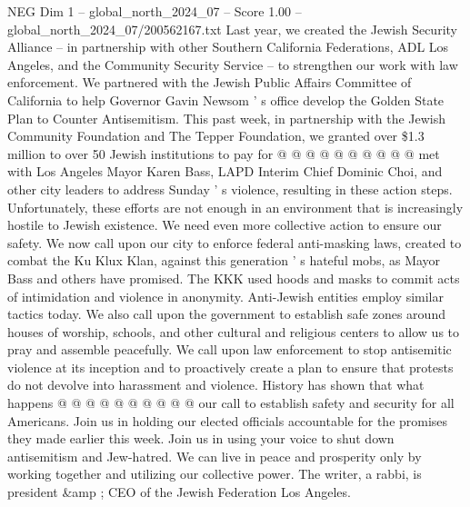 \begin{textsample}{NEG Dim 1 – global\_north\_2024\_07 – Score 1.00 – global\_north\_2024\_07/200562167.txt}
Last year, we created the Jewish Security Alliance -- in partnership with other Southern California Federations, ADL Los Angeles, and the Community Security Service -- to strengthen our work with law enforcement.
We partnered with the Jewish Public Affairs Committee of California to help Governor Gavin Newsom ' s office develop the Golden State Plan to Counter Antisemitism.
This past week, in partnership with the Jewish Community Foundation and The Tepper Foundation, we granted over \$1.3 million to over 50 Jewish institutions to pay for @ @ @ @ @ @ @ @ @ @ met with Los Angeles Mayor Karen Bass, LAPD Interim Chief Dominic Choi, and other city leaders to address Sunday ' s violence, resulting in these action steps.
Unfortunately, these efforts are not enough in an environment that is increasingly hostile to Jewish existence.
We need even more collective action to ensure our safety.
We now call upon our city to enforce federal anti-masking laws, created to combat the Ku Klux Klan, against this generation ' s hateful mobs, as Mayor Bass and others have promised.
The KKK used hoods and masks to commit acts of intimidation and violence in anonymity.
Anti-Jewish entities employ similar tactics today.
We also call upon the government to establish safe zones around houses of worship, schools, and other cultural and religious centers to allow us to pray and assemble peacefully.
We call upon law enforcement to stop antisemitic violence at its inception and to proactively create a plan to ensure that protests do not devolve into harassment and violence.
History has shown that what happens @ @ @ @ @ @ @ @ @ @ our call to establish safety and security for all Americans.
Join us in holding our elected officials accountable for the promises they made earlier this week.
Join us in using your voice to shut down antisemitism and Jew-hatred.
We can live in peace and prosperity only by working together and utilizing our collective power.
The writer, a rabbi, is president \&amp ; CEO of the Jewish Federation Los Angeles.

\end{textsample}

